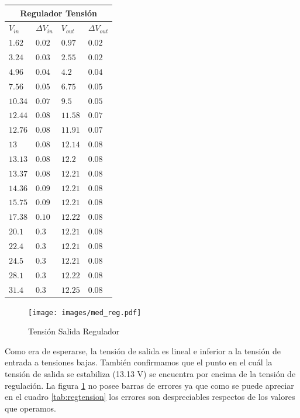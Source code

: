 \documentclass[12pt,a4paper]{article}
\begin{document}
			\begin{center}
			{\footnotesize \begin{tabular}{ |l|l|l|l| }

			\hline
				\multicolumn{4}{|c|}{\textbf{Regulador Tensión}}\\ \hline
				$V_{in}$ & $\Delta V_{in}$ & $V_{out}$ & $\Delta V_{out}$ \\ \hline
				$1.62$ & $0.02$ & $0.97$ & $0.02$\\ \hline
				$3.24$ & $0.03$ & $2.55$ & $0.02$\\ \hline
				$4.96$ & $0.04$ & $4.2$ & $0.04$\\ \hline
				$7.56$ & $0.05$ & $6.75$ & $0.05$\\ \hline
				$10.34$ & $0.07$ &  $9.5$ & $0.05$\\ \hline
				$12.44$ & $0.08$ & $11.58$ & $0.07$\\ \hline
				$12.76$ & $0.08$ & $11.91$ & $0.07$\\ \hline
				$13$ & $0.08$ & $12.14$ & $0.08$\\ \hline
				$13.13$ & $0.08$ & $12.2$ & $0.08$\\ \hline
				$13.37$ & $0.08$ & $12.21$ & $0.08$\\ \hline
				$14.36$ & $0.09$ & $12.21$ & $0.08$\\ \hline
				$15.75$ & $0.09$ & $12.21$ & $0.08$ \\ \hline
				$17.38$ & $0.10$ & $12.22$ & $0.08$\\ \hline
				$20.1$ & $0.3$ &  $12.21$ & $0.08$ \\ \hline
				$22.4$ & $0.3$ &  $12.21$ & $0.08$ \\ \hline
				$24.5$ & $0.3$ &  $12.21$ & $0.08$ \\ \hline
				$28.1$ & $0.3$ &  $12.22$ & $0.08$ \\ \hline
				$31.4$ & $0.3$ &  $12.25$ & $0.08$ \\ \hline			
 				
				
			\end{tabular}}\label{tab:regtension}
			\end{center}

			\begin{figure}[H]
			\centering
				\texttt{[image: images/med\_reg.pdf]}\caption{Tensión Salida Regulador}\label{fig:grafreg}
			\end{figure}

			Como era de esperarse, la tensión de salida es lineal e inferior a la tensión de entrada a tensiones bajas. También confirmamos que el punto en el cuál la tensión de salida se estabiliza (13.13 V) se encuentra por encima de la tensión de regulación. La figura \ref{fig:grafreg} no posee barras de errores ya que como se puede apreciar en el cuadro \ref{tab:regtension} los errores son despreciables respectos de los valores que operamos.
\end{document}
